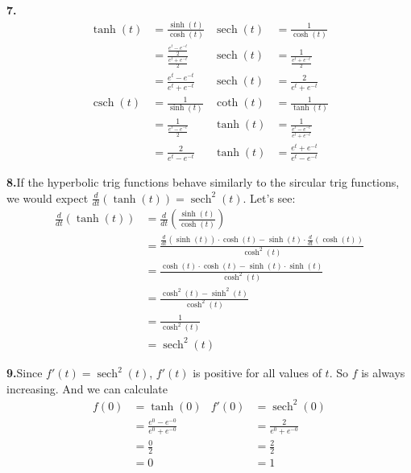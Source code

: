 \documentclass[10pt,oneside,]{book}
\theoremstyle{plain}
\theoremstyle{definition}
\numberwithin{equation}{section}
\newcommand{\fe}[2]{#1\mathopen{}\left(#2\right)\mathclose{}}
\newcommand{\fd}[1]{#1'}
\newcommand{\lzoo}[2]{{\frac{d}{d#1}}{\left(#2\right)}}
\newcommand{\sech}{\operatorname{sech}}
\newcommand{\csch}{\operatorname{csch}}
\begin{document}
\par\smallskip
\noindent\textbf{7.}\quad{}\begin{align*}
\fe{\tanh}{t}&=\frac{\fe{\sinh}{t}}{\fe{\cosh}{t}}&\fe{\sech}{t}&=\frac{1}{\fe{\cosh}{t}}\\
&=\frac{\frac{e^t-e^{-t}}{2}}{\frac{e^t+e^{-t}}{2}}&\fe{\sech}{t}&=\frac{1}{\frac{e^t+e^{-t}}{2}}\\
&=\frac{e^t-e^{-t}}{e^t+e^{-t}}&\fe{\sech}{t}&=\frac{2}{e^t+e^{-t}}\\
\fe{\csch}{t}&=\frac{1}{\fe{\sinh}{t}}&\fe{\coth}{t}&=\frac{1}{\fe{\tanh}{t}}\\
&=\frac{1}{\frac{e^t-e^{-t}}{2}}&\fe{\tanh}{t}&=\frac{1}{\frac{e^t-e^{-t}}{e^t+e^{-t}}}\\
&=\frac{2}{e^t-e^{-t}}&\fe{\tanh}{t}&=\frac{e^t+e^{-t}}{e^t-e^{-t}}
\end{align*}%
\par\smallskip
\noindent\textbf{8.}\quad{}If the hyperbolic trig functions behave similarly to the sircular trig functions, we would expect \(\lzoo{t}{\fe{\tanh}{t}}=\fe{\sech^2}{t}\). Let's see:\begin{align*}
\lzoo{t}{\fe{\tanh}{t}}&=\lzoo{t}{\frac{\fe{\sinh}{t}}{\fe{\cosh}{t}}}\\
&=\frac{\lzoo{t}{\fe{\sinh}{t}}\cdot\fe{\cosh}{t}-\fe{\sinh}{t}\cdot\lzoo{t}{\fe{\cosh}{t}}}{\fe{\cosh^2}{t}}\\
&=\frac{\fe{\cosh}{t}\cdot\fe{\cosh}{t}-\fe{\sinh}{t}\cdot\fe{\sinh}{t}}{\fe{\cosh^2}{t}}\\
&=\frac{\fe{\cosh^2}{t}-\fe{\sinh^2}{t}}{\fe{\cosh^2}{t}}\\
&=\frac{1}{\fe{\cosh^2}{t}}\\
&=\fe{\sech^2}{t}
\end{align*}%
\par\smallskip
\noindent\textbf{9.}\quad{}Since \(\fe{\fd{f}}{t}=\fe{\sech^2}{t}\), \(\fe{\fd{f}}{t}\) is positive for all values of \(t\). So \(f\) is always increasing. And we can calculate\begin{align*}
\fe{f}{0}&=\fe{\tanh}{0}&\fe{\fd{f}}{0}&=\fe{\sech^2}{0}\\
&=\frac{e^0-e^{-0}}{e^0+e^{-0}}&&=\frac{2}{e^0+e^{-0}}\\
&=\frac{0}{2}&&=\frac{2}{2}\\
&=0&&=1
\end{align*}%
\par\smallskip
\end{document}
